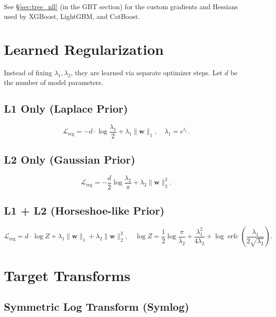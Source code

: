 \documentclass[11pt,a4paper]{article}
\theoremstyle{definition}
\newcommand{\bw}{\mathbf{w}}
\DeclareMathOperator{\erfc}{erfc}
\begin{document}
See \S\ref{sec:tree_nll} (in the GBT section) for the custom gradients and
Hessians used by XGBoost, LightGBM, and CatBoost.

\section{Learned Regularization}
\label{sec:learned_reg}

Instead of fixing $\lambda_1, \lambda_2$, they are learned via
separate optimizer steps. Let $d$ be the number of model parameters.

\subsection{L1 Only (Laplace Prior)}

\[
  \mathcal{L}_{\mathrm{reg}} = -d \cdot \log\frac{\lambda_1}{2} + \lambda_1 \|\bw\|_1,
  \quad \lambda_1 = e^{\ell_1}.
\]

\subsection{L2 Only (Gaussian Prior)}

\[
  \mathcal{L}_{\mathrm{reg}} = -\frac{d}{2} \log\frac{\lambda_2}{\pi} + \lambda_2 \|\bw\|_2^2.
\]

\subsection{L1 + L2 (Horseshoe-like Prior)}

\[
  \mathcal{L}_{\mathrm{reg}} = d \cdot \log Z + \lambda_1 \|\bw\|_1 + \lambda_2 \|\bw\|_2^2,
  \quad
  \log Z = \frac{1}{2}\log\frac{\pi}{\lambda_2} + \frac{\lambda_1^2}{4\lambda_2} + \log\erfc\!\left(\frac{\lambda_1}{2\sqrt{\lambda_2}}\right).
\]

\section{Target Transforms}
\label{sec:transforms}

\subsection{Symmetric Log Transform (Symlog)}
\end{document}
